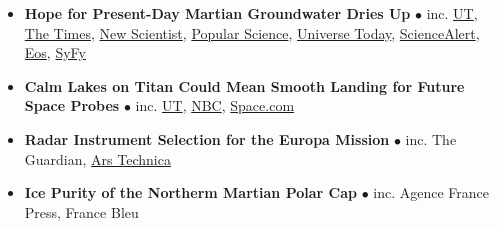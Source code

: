 \begin{itemize}[leftmargin=3.8em, labelsep=1.5em]
    \item[\texttt{2022}] \textbf{Hope for Present-Day Martian Groundwater Dries Up} $\bullet$ inc. \href{https://news.utexas.edu/2022/01/24/hope-for-present-day-martian-groundwater-dries-up/}{UT}, \href{https://www.thetimes.co.uk/article/hope-dries-up-of-water-on-mars-qngbmwdgp}{The Times}, \href{https://www.newscientist.com/article/2305601-mars-lake-may-actually-be-volcanic-rocks-buried-beneath-the-ice-cap/}{New Scientist}, \href{https://www.popsci.com/science/liquid-water-on-mars-debate/}{Popular Science}, \href{https://www.universetoday.com/154242/is-the-underground-lake-on-mars-just-volcanic-rock/#more-154242}{Universe Today}, \href{https://www.sciencealert.com/liquid-water-detected-under-mars-polar-ice-cap-was-probably-just-rock-new-study-reveals}{ScienceAlert}, \href{https://eos.org/articles/the-bumpy-search-for-liquid-water-at-the-south-pole-of-mars}{Eos}, \href{https://www.syfy.com/syfy-wire/bad-astronomy-liquid-water-under-martian-ice-cap-debate}{SyFy}
    
    \item[\texttt{2017}] \textbf{Calm Lakes on Titan Could Mean Smooth Landing for Future Space Probes} $\bullet$ inc. \href{https://news.utexas.edu/2017/07/06/calm-lakes-on-titan/}{UT}, \href{https://www.nbcnews.com/mach/science/you-can-forget-about-surfing-saturn-s-moon-titan-here-ncna780711}{NBC}, \href{https://www.space.com/37417-saturn-moon-titan-calm-seas-cassini.html}{Space.com}
    
    \item[\texttt{2015}] \textbf{Radar Instrument Selection for the Europa Mission} $\bullet$ inc. The Guardian, \href{https://arstechnica.com/science/2015/11/attempt-no-landing-there-yeah-right-were-going-to-europa/}{Ars Technica}
    \item[\texttt{2009}] \textbf{Ice Purity of the Northerm Martian Polar Cap} $\bullet$ inc. Agence France Press, France Bleu
    
\end{itemize}